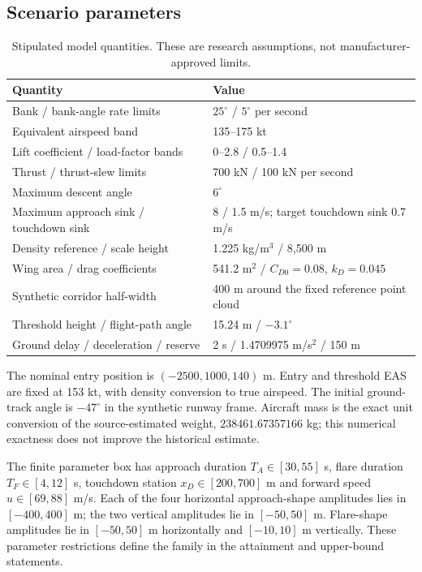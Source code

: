 \subsection{Scenario parameters}
\begin{table}[H]
\caption{Stipulated model quantities. These are research assumptions, not manufacturer-approved limits.}
\small
\begin{tabularx}{\textwidth}{@{}XX@{}}
\toprule
Quantity & Value\\
\midrule
Bank / bank-angle rate limits & $25^\circ$ / $5^\circ$ per second\\
Equivalent airspeed band & 135--175 kt\\
Lift coefficient / load-factor bands & 0--2.8 / 0.5--1.4\\
Thrust / thrust-slew limits & 700 kN / 100 kN per second\\
Maximum descent angle & $6^\circ$\\
Maximum approach sink / touchdown sink & 8 / 1.5 m/s; target touchdown sink 0.7 m/s\\
Density reference / scale height & 1.225 kg/m$^3$ / 8,500 m\\
Wing area / drag coefficients & 541.2 m$^2$ / $C_{D0}=0.08$, $k_D=0.045$\\
Synthetic corridor half-width & 400 m around the fixed reference point cloud\\
Threshold height / flight-path angle & 15.24 m / $-3.1^\circ$\\
Ground delay / deceleration / reserve & 2 s / 1.4709975 m/s$^2$ / 150 m\\
\bottomrule
\end{tabularx}
\end{table}

The nominal entry position is $(-2500,1000,140)$ m. Entry and threshold EAS are fixed at 153 kt, with density conversion to true airspeed. The initial ground-track angle is $-47^\circ$ in the synthetic runway frame. Aircraft mass is the exact unit conversion of the source-estimated weight, $238461.67357166$ kg; this numerical exactness does not improve the historical estimate.

The finite parameter box has approach duration $T_A\in[30,55]$ s, flare duration $T_F\in[4,12]$ s, touchdown station $x_D\in[200,700]$ m and forward speed $u\in[69,88]$ m/s. Each of the four horizontal approach-shape amplitudes lies in $[-400,400]$ m; the two vertical amplitudes lie in $[-50,50]$ m. Flare-shape amplitudes lie in $[-50,50]$ m horizontally and $[-10,10]$ m vertically. These parameter restrictions define the family in the attainment and upper-bound statements.


